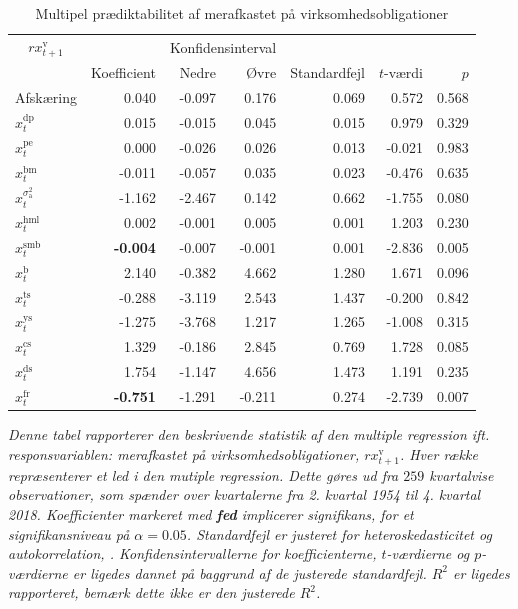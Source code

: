 \documentclass[
  a4paper,
  oneside]{memoir}
\begin{document}
\begin{table}[H]

\caption{\label{tab:MULT-v}Multipel prædiktabilitet af merafkastet på virksomhedsobligationer}
\centering
\begin{threeparttable}
\begin{tabular}[t]{lrrrrrr}
\toprule
\multicolumn{1}{c}{$rx_{t+1}^{\text{v}}$} & \multicolumn{1}{c}{ } & \multicolumn{2}{c}{Konfidensinterval} & \multicolumn{3}{c}{ } \\
\cmidrule(l{3pt}r{3pt}){1-1} \cmidrule(l{3pt}r{3pt}){3-4}
  & Koefficient & Nedre & Øvre & Standardfejl & $t$-værdi & $p$\\
\midrule
\rowcolor{gray!6}  Afskæring & 0.040 & -0.097 & 0.176 & 0.069 & 0.572 & 0.568\\
$x_t^{\text{dp}}$ & 0.015 & -0.015 & 0.045 & 0.015 & 0.979 & 0.329\\
\rowcolor{gray!6}  $x_t^{\text{pe}}$ & 0.000 & -0.026 & 0.026 & 0.013 & -0.021 & 0.983\\
$x_t^{\text{bm}}$ & -0.011 & -0.057 & 0.035 & 0.023 & -0.476 & 0.635\\
\rowcolor{gray!6}  $x_t^{\sigma_{\text{a}}^2}$ & -1.162 & -2.467 & 0.142 & 0.662 & -1.755 & 0.080\\
$x_t^{\text{hml}}$ & 0.002 & -0.001 & 0.005 & 0.001 & 1.203 & 0.230\\
\rowcolor{gray!6}  $x_t^{\text{smb}}$ & \textbf{-0.004} & -0.007 & -0.001 & 0.001 & -2.836 & 0.005\\
$x_t^{\text{b}}$ & 2.140 & -0.382 & 4.662 & 1.280 & 1.671 & 0.096\\
\rowcolor{gray!6}  $x_t^{\text{ts}}$ & -0.288 & -3.119 & 2.543 & 1.437 & -0.200 & 0.842\\
$x_t^{\text{ys}}$ & -1.275 & -3.768 & 1.217 & 1.265 & -1.008 & 0.315\\
\rowcolor{gray!6}  $x_t^{\text{cs}}$ & 1.329 & -0.186 & 2.845 & 0.769 & 1.728 & 0.085\\
$x_t^{\text{ds}}$ & 1.754 & -1.147 & 4.656 & 1.473 & 1.191 & 0.235\\
\rowcolor{gray!6}  $x_t^{\text{fr}}$ & \textbf{-0.751} & -1.291 & -0.211 & 0.274 & -2.739 & 0.007\\
\bottomrule
\end{tabular}
\begin{tablenotes}
\item \textit{Denne tabel rapporterer den beskrivende statistik af den multiple regression ift. responsvariablen: merafkastet på virksomhedsobligationer, $rx_{t+1}^{\text{v}}$. Hver række repræsenterer et led i den mutiple regression. Dette gøres ud fra $259$ kvartalvise observationer, som spænder over kvartalerne fra 2. kvartal 1954 til 4. kvartal 2018. Koefficienter markeret med \textbf{fed} implicerer signifikans, for et signifikansniveau på $\alpha=0.05$. Standardfejl er justeret for heteroskedasticitet og autokorrelation, \citep{Newey1987}. Konfidensintervallerne for koefficienterne, $t$-værdierne og $p$-værdierne er ligedes dannet på baggrund af de justerede standardfejl. $R^2$ er ligedes rapporteret, bemærk dette ikke er den justerede $R^2$.}

\end{tablenotes}
\end{threeparttable}
\end{table}
\end{document}
